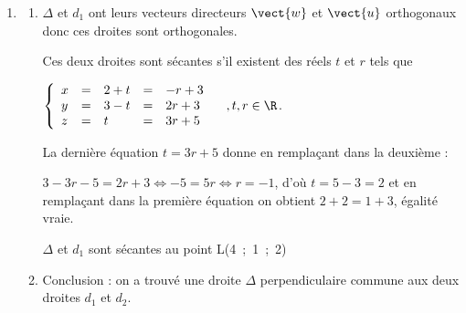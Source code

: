 \begin{enumerate}
\begin{enumerate}
$\left\{\begin{array}{l c l}
x &=&2k - 3\\
y &=&k\\
z &=&5\\
5x + 4y - z - 22 &=& 0
\end{array}\right. \quad , t \in \R$, d'où en remplaçant $x,\:y,\:z$ dans la dernière équation :

$5(2k - 3) + 4(k) - 5 - 22 = 0\iff 10k - 15 + 4k - 27 = 0\iff 14k = 42 \iff 7k = 21 \iff k = 3$.

Le point commun au plan $P$ et à la droite $d_2$ a pour coordonnées (6 - 3~;~3~;~5) soit M(3~;~3~;~5).
	\end{enumerate}
\item 	
	\begin{enumerate}
		\item $\Delta$ et $d_1$ ont leurs vecteurs directeurs $\vect{w}$ et $\vect{u}$  orthogonaux donc ces droites sont orthogonales.
		
Ces deux droites sont sécantes s'il existent des réels $t$ et $r$ tels que 

$\left\{\begin{array}{l c l c l}
x&=&2 + t&=&- r + 3\\
y&=&3 - t&=&2r + 3\\
z&=&t   &=&3r + 5
\end{array}\right. \quad , t, r  \in \R$.

La dernière équation $t = 3r + 5$ donne en remplaçant dans la deuxième : 

$3 - 3r - 5 = 2r + 3 \iff - 5 = 5r \iff r = - 1$, d'où $t = 5 - 3 = 2$ et en remplaçant dans la première équation on obtient $2 + 2 = 1 + 3$, égalité vraie.

$\Delta$ et $d_1$ sont sécantes au point L(4~;~1~;~2)
		\item  Conclusion : on a trouvé une droite $\Delta$ perpendiculaire commune aux deux droites $d_1$ et $d_2$.
	\end{enumerate}
\end{enumerate}

\bigskip

